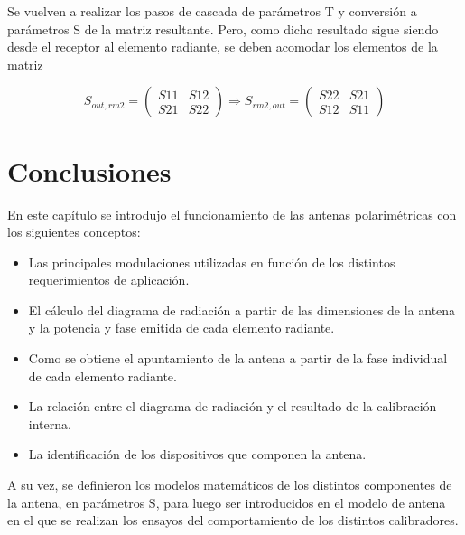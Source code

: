 Se vuelven a realizar los pasos de cascada de parámetros T y conversión a parámetros S de la matriz resultante. Pero, como
dicho resultado sigue siendo desde el receptor al elemento radiante, se deben acomodar los elementos de la matriz

$$
	S_{out,rm2} = \begin{pmatrix} S11&S12 \\ S21&S22\end{pmatrix} \Rightarrow
	S_{rm2, out} = \begin{pmatrix} S22&S21 \\ S12&S11 \end{pmatrix}
$$

\section{Conclusiones}

En este capítulo se introdujo el funcionamiento de las antenas polarimétricas con los siguientes conceptos:
\begin{itemize}
	\item Las principales modulaciones utilizadas en función de los distintos requerimientos de aplicación.
	\item El cálculo del diagrama de radiación a partir de las dimensiones de la antena y la potencia y fase emitida de cada 
		elemento radiante.
	\item Como se obtiene el apuntamiento de la antena a partir de la fase individual de cada elemento radiante. 
	\item La relación entre el diagrama de radiación y el resultado de la calibración interna. 
	\item La identificación de los dispositivos que componen la antena.
\end{itemize}

A su vez, se definieron los modelos matemáticos de los distintos componentes de la antena, en parámetros S, para luego ser
introducidos en el modelo de antena en el que se realizan los ensayos del comportamiento de los distintos calibradores. 


